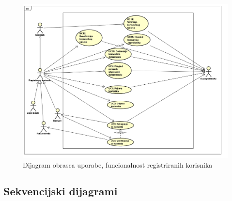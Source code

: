 			
				\begin{figure}[H]
				\includegraphics[scale=0.65]{slike/Korisnik.png} %
				\centering
				\caption{Dijagram obrasca uporabe, funcionalnost registriranih korisnika}
				\label{DUC2}
			\end{figure}				
					
			\newpage	
			\subsection{Sekvencijski dijagrami}
				

